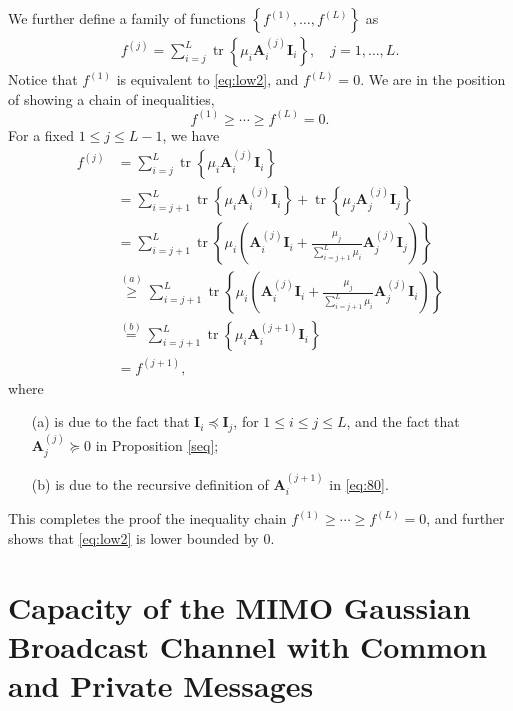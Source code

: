 \documentclass[journal,final, onecolumn]{IEEEtran}
\DeclareMathOperator{\tr}{tr}
\begin{document}
We further define a family of functions $\left\{ f^{(1)}, \ldots, f^{(L)}\right\}$ as
\begin{align}
f^{(j)} = \sum_{i=j}^{L} \tr \left\{   \mu_{i}\boldsymbol{A}^{(j)}_{i}\boldsymbol{I}_{i}        \right\}, \quad j=1,\ldots,L.
\end{align}
Notice that $f^{(1)}$ is equivalent to \eqref{eq:low2}, and $f^{(L)}=0$. We are in the position of showing a chain of inequalities,
\begin{equation}
f^{(1)} \geq \cdots \geq f^{(L)}=0.
\end{equation}
 For a fixed $1\leq j \leq L-1$, we have
 \begin{align}
 f^{(j)} &= \sum_{i=j}^{L} \tr \left\{   \mu_{i}\boldsymbol{A}^{(j)}_{i}\boldsymbol{I}_{i}        \right\} \\
 &= \sum_{i=j+1}^{L} \tr \left\{ \mu_{i}\boldsymbol{A}^{(j)}_{i}\boldsymbol{I}_{i}       \right\}+ \tr \left\{ \mu_{j}\boldsymbol{A}^{(j)}_{j} \boldsymbol{I}_{j}\right\} \\
 &=\sum_{i=j+1}^{L} \tr \left\{ \mu_{i}  \left( \boldsymbol{A}^{(j)}_{i}\boldsymbol{I}_{i} +    \frac{\mu_{j}}{\sum_{i=j+1}^{L}\mu_i} \boldsymbol{A}^{(j)}_{j} \boldsymbol{I}_{j}  \right)  \right\} \\
 &\overset{(a)}\geq\sum_{i=j+1}^{L} \tr \left\{ \mu_{i}  \left( \boldsymbol{A}^{(j)}_{i}\boldsymbol{I}_{i} +    \frac{\mu_{j}}{\sum_{i=j+1}^{L}\mu_i} \boldsymbol{A}^{(j)}_{j} \boldsymbol{I}_{i}  \right)  \right\}\\
 & \overset{(b)} = \sum_{i=j+1}^{L}\tr \left\{ \mu_{i}  \boldsymbol{A}^{(j+1)}_{i}\boldsymbol{I}_{i}   \right\} \\
 &= f^{(j+1)},
 \end{align}
where
\begin{enumerate}
\item[(a)] is due to the fact that $\boldsymbol{I}_{i} \preceq \boldsymbol{I}_{j}$, for $1 \leq i \leq j \leq L$, and the fact that $\boldsymbol{A}_{j}^{(j)} \succeq 0$ in Proposition \ref{seq};
\item[(b)] is due to the recursive definition of $\boldsymbol{A}^{(j+1)}_{i}$ in \eqref{eq:80}.
\end{enumerate}
This completes the proof the inequality chain $f^{(1)} \geq \cdots \geq f^{(L)}=0$, and further shows that \eqref{eq:low2} is lower bounded by $0$.




\section{Capacity of the MIMO Gaussian Broadcast Channel with Common and Private Messages}\label{sec4}
\end{document}
